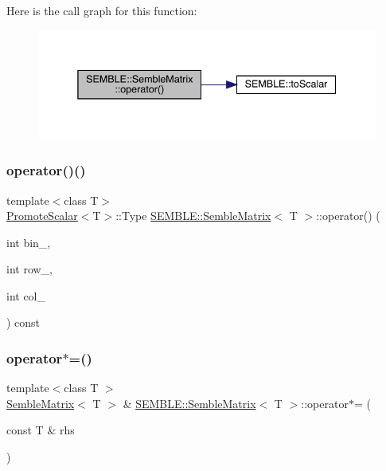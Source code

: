 Here is the call graph for this function\+:
\nopagebreak
\begin{figure}[H]
\begin{center}
\leavevmode
\includegraphics[width=338pt]{df/d87/structSEMBLE_1_1SembleMatrix_abebebe665ebbe033993dbc10e29c73e3_cgraph}
\end{center}
\end{figure}
\mbox{\label{structSEMBLE_1_1SembleMatrix_a8c7221108aa9bee53e6261599685944b}} 
\subsubsection{\texorpdfstring{operator()()}{operator()()}\hspace{0.1cm}{\footnotesize\ttfamily [4/4]}}
{\footnotesize\ttfamily template$<$class T$>$ \\
\mbox{\hyperlink{structSEMBLE_1_1PromoteScalar}{Promote\+Scalar}}$<$T$>$\+::Type \mbox{\hyperlink{structSEMBLE_1_1SembleMatrix}{S\+E\+M\+B\+L\+E\+::\+Semble\+Matrix}}$<$ T $>$\+::operator() (\begin{DoxyParamCaption}\item[{int}]{bin\+\_\+,  }\item[{int}]{row\+\_\+,  }\item[{int}]{col\+\_\+ }\end{DoxyParamCaption}) const}

\mbox{\label{structSEMBLE_1_1SembleMatrix_ac14d8431e3f54854981c8a2355cbcc5b}} 
\subsubsection{\texorpdfstring{operator$\ast$=()}{operator*=()}\hspace{0.1cm}{\footnotesize\ttfamily [1/10]}}
{\footnotesize\ttfamily template$<$class T $>$ \\
\mbox{\hyperlink{structSEMBLE_1_1SembleMatrix}{Semble\+Matrix}}$<$ T $>$ \& \mbox{\hyperlink{structSEMBLE_1_1SembleMatrix}{S\+E\+M\+B\+L\+E\+::\+Semble\+Matrix}}$<$ T $>$\+::operator$\ast$= (\begin{DoxyParamCaption}\item[{const T \&}]{rhs }\end{DoxyParamCaption})}

